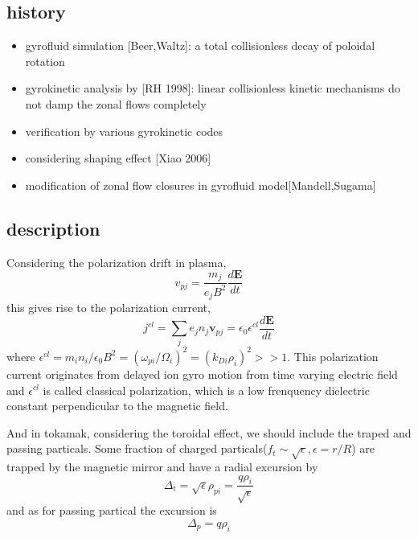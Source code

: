 \documentclass[11pt,a4paper]{article}
\begin{document}
	\subsection{history}
	\begin{itemize}
		\item gyrofluid simulation [Beer,Waltz]: a total collisionless decay of poloidal rotation
		\item gyrokinetic analysis by [RH 1998]: linear collisionless kinetic mechanisms do not damp the zonal flows completely
		\item verification by various gyrokinetic codes
		\item considering shaping effect [Xiao 2006]
		\item modification of zonal flow closures in gyrofluid model[Mandell,Sugama]
	\end{itemize}
	
	\subsection{description}
	Considering the polarization drift in plasma, 
\begin{equation}
	v_{pj}=\frac{m_j}{e_jB^2}\frac{d\pmb{E}}{dt}
	\end{equation}
	this gives rise to the polarization current,
	\begin{equation}
	j^{cl}=\sum_{j}{e_jn_j\pmb{v}_{pj}}=\epsilon_0\epsilon^{cl}\frac{d\pmb{E}}{dt}
	\end{equation}
	where $\epsilon^{cl}=m_in_i/\epsilon_0B^2=(\omega_{pi}/\Omega_i)^2=(k_{Di}\rho_i)^2>>1$. This polarization current originates from delayed ion gyro motion from time varying electric field and $\epsilon^{cl}$ is called classical polarization, which is a low frenquency dielectric constant perpendicular to the magnetic field.

	And in tokamak, considering the toroidal effect, we should include the traped and passing particals. Some fraction of charged particals($f_t\sim\sqrt{\epsilon},\epsilon=r/R$) are trapped by the magnetic mirror and have a radial excursion by 
	\begin{equation}
		\Delta_t=\sqrt{\epsilon}\rho_{pi}=\frac{q\rho_i}{\sqrt{\epsilon}}
	\end{equation}
	and as for passing partical the excursion is
	\begin{equation}
		\Delta_p=q\rho_i
	\end{equation}
	
\end{document}
